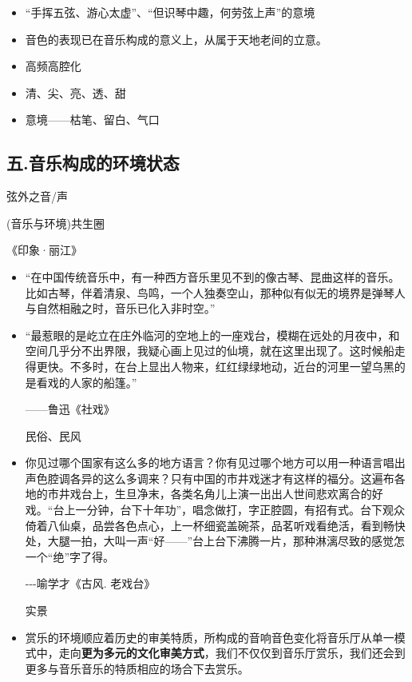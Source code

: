 \documentclass[
]{article}
\providecommand{\tightlist}{%
  \setlength{\itemsep}{0pt}\setlength{\parskip}{0pt}}
\begin{document}
\begin{itemize}
\tightlist
\item
  ``手挥五弦、游心太虚''、``但识琴中趣，何劳弦上声''的意境
\item
  音色的表现已在音乐构成的意义上，从属于天地老间的立意。
\item
  高频高腔化
\item
  清、尖、亮、透、甜
\item
  意境------枯笔、留白、气口
\end{itemize}

\subsection{五.音乐构成的环境状态}\label{ux4e94.ux97f3ux4e50ux6784ux6210ux7684ux73afux5883ux72b6ux6001}

弦外之音/声

(音乐与环境)共生圈

《印象·丽江》

\begin{itemize}
\item
  ``在中国传统音乐中，有一种西方音乐里见不到的像古琴、昆曲这样的音乐。比如古琴，伴着清泉、鸟鸣，一个人独奏空山，那种似有似无的境界是弹琴人与自然相融之时，音乐已化入非时空。''
\item
  ``最惹眼的是屹立在庄外临河的空地上的一座戏台，模糊在远处的月夜中，和空间几乎分不出界限，我疑心画上见过的仙境，就在这里出现了。这时候船走得更快。不多时，在台上显出人物来，红红绿绿地动，近台的河里一望乌黑的是看戏的人家的船篷。''

  ------鲁迅《社戏》

  民俗、民风
\item
  你见过哪个国家有这么多的地方语言？你有见过哪个地方可以用一种语言唱出声色腔调各异的这么多调来？只有中国的市井戏迷才有这样的福分。这遍布各地的市井戏台上，生旦净末，各类名角儿上演一出出人世间悲欢离合的好戏。``台上一分钟，台下十年功''，唱念做打，字正腔圆，有招有式。台下观众倚着八仙桌，品尝各色点心，上一杯细瓷盖碗茶，品茗听戏看绝活，看到畅快处，大腿一拍，大叫一声``好------''台上台下沸腾一片，那种淋漓尽致的感觉怎一个``绝''字了得。

  -\/-\/-喻学才《古风. 老戏台》

  实景
\item
  赏乐的环境顺应着历史的审美特质，所构成的音响音色变化将音乐厅从单一模式中，走向\textbf{更为多元的文化审美方式}，我们不仅仅到音乐厅赏乐，我们还会到更多与音乐音乐的特质相应的场合下去赏乐。
\end{itemize}
\end{document}
